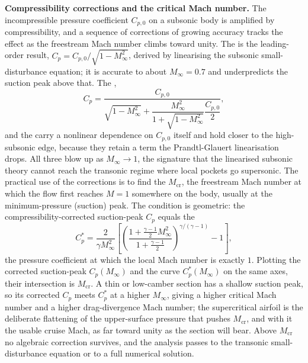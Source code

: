 \begin{mastery}
\textbf{Compressibility corrections and the critical Mach number.} The
incompressible pressure coefficient $C_{p,0}$ on a subsonic body is
amplified by compressibility, and a sequence of corrections of growing
accuracy tracks the effect as the freestream Mach number climbs toward
unity. The  is the leading-order result,
$C_p = C_{p,0}/\sqrt{1 - M_\infty^2}$, derived by linearising the
subsonic small-disturbance equation; it is accurate to about
$M_\infty = 0.7$ and underpredicts the suction peak above that. The
,
\[
C_p = \frac{C_{p,0}}{\sqrt{1 - M_\infty^2} + \dfrac{M_\infty^2}{1 +
\sqrt{1 - M_\infty^2}}\dfrac{C_{p,0}}{2}},
\]
and the  carry a nonlinear dependence on
$C_{p,0}$ itself and hold closer to the high-subsonic edge, because they
retain a term the Prandtl-Glauert linearisation drops. All three blow up
as $M_\infty \to 1$, the signature that the linearised subsonic theory
cannot reach the transonic regime where local pockets go supersonic.
The practical use of the corrections is to find the  $M_{\text{cr}}$, the freestream Mach number at which the
flow first reaches $M = 1$ somewhere on the body, usually at the
minimum-pressure (suction) peak. The condition is geometric: the
compressibility-corrected suction-peak $C_p$ equals the
\[
C_p^* = \frac{2}{\gamma M_\infty^2}\left[\left(\frac{1 +
\frac{\gamma - 1}{2}M_\infty^2}{1 + \frac{\gamma - 1}{2}}\right)^{
\gamma/(\gamma - 1)} - 1\right],
\]
the pressure coefficient at which the local Mach number is exactly $1$.
Plotting the corrected suction-peak $C_p(M_\infty)$ and the curve
$C_p^*(M_\infty)$ on the same axes, their intersection is $M_{\text{cr}}$.
A thin or low-camber section has a shallow suction peak, so its
corrected $C_p$ meets $C_p^*$ at a higher $M_\infty$, giving a higher
critical Mach number and a higher drag-divergence Mach number; the
supercritical airfoil is the deliberate flattening of the upper-surface
pressure that pushes $M_{\text{cr}}$, and with it the usable cruise
Mach, as far toward unity as the section will bear. Above $M_{\text{cr}}$
no algebraic correction survives, and the analysis passes to the
transonic small-disturbance equation or to a full numerical solution.
\end{mastery}

